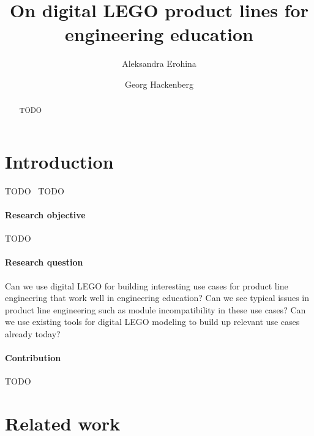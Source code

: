 \documentclass[sigconf,review]{acmart}
\begin{document}
\title{On digital LEGO product lines for engineering education}

\author{Aleksandra Erohina}

\author{Georg Hackenberg}

\begin{abstract}
    TODO
\end{abstract}


\maketitle

\section{Introduction}
\label{sec:introduction}

TODO~\cite{Hackenberg_2023} TODO~\cite{Baldwin_2023}

\paragraph{Research objective}

TODO

\paragraph{Research question}

Can we use digital LEGO for building interesting use cases for product line engineering that work well in engineering education?
Can we see typical issues in product line engineering such as module incompatibility in these use cases?
Can we use existing tools for digital LEGO modeling to build up relevant use cases already today?

\paragraph{Contribution}

TODO

\section{Related work}
\label{sec:related-work}
\end{document}
